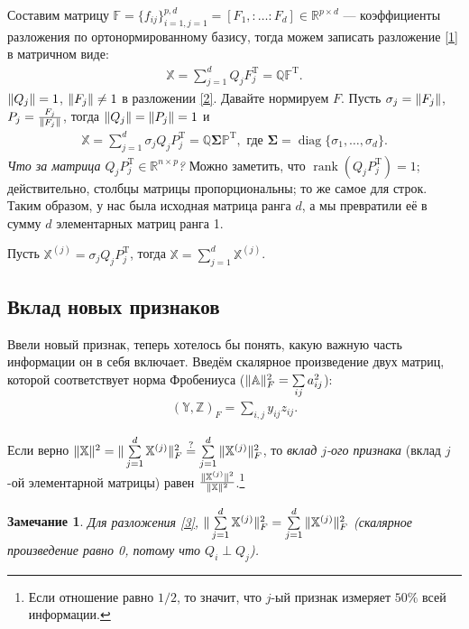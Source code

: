 \documentclass[specialist, 12pt,
subf, %
href, colorlinks=true,
substylefile = spbu.rtx,
]{disser}
\newtheorem{proposition}{Предложение}
\newtheorem{remark}{Замечание}
\DeclareMathOperator{\diag}{diag}
\DeclareMathOperator{\rnk}{rank}
\begin{document}
Составим матрицу $\mathbb{F} = \{f_{ij}\}_{i = 1, j = 1}^{p,d}= [F_1,:\ldots:F_d] \in \mathbb{R}^{p \times d}$ --- коэффициенты разложения по ортонормированному базису, тогда можем записать разложение \eqref{1} в матричном виде:
\begin{gather}\label{2}
\mathbb{X} = \sum\limits_{j = 1}^d Q_j F_j^{\mathrm{T}} = \mathbb{Q}\mathbb{F}^{\mathrm{T}}.
\end{gather}
$\Arrowvert Q_j\Arrowvert = 1$, $\Arrowvert F_j\Arrowvert \neq 1$ в разложении \eqref{2}. Давайте нормируем $F$. Пусть $\sigma_j = \Arrowvert F_j\Arrowvert$, $P_j = \frac{F_j}{\Arrowvert F_j\Arrowvert}$, тогда $\Arrowvert Q_j\Arrowvert = \Arrowvert P_j\Arrowvert = 1$ и
\begin{gather}\label{3}
\mathbb{X} = \sum\limits_{j = 1}^d \sigma_j Q_j P_j^{\mathrm{T}} = \mathbb{Q} \mathbf{\bm\Sigma} \mathbb{P}^{\mathrm{T}}, \text{ где $\mathbf{\bm\Sigma} = \diag\{\sigma_1, \ldots, \sigma_d\}$.}
\end{gather}
\textit{Что за матрица $Q_jP_j^{\mathrm{T}} \in \mathbb{R}^{n \times p}$?} Можно заметить, что $\rnk(Q_jP_j^{\mathrm{T}}) = 1$; действительно, столбцы матрицы пропорциональны; то же самое для строк. Таким образом, у нас была исходная матрица ранга $d$, а мы превратили её в сумму $d$ элементарных матриц ранга 1.


Пусть $\mathbb{X}^{(j)} = \sigma_jQ_jP_j^{\mathrm{T}}$, тогда $\mathbb{X} = \sum\limits_{j = 1}^d \mathbb{X}^{(j)}$.
\subsection{Вклад новых признаков}
Ввели новый признак, теперь хотелось бы понять, какую важную часть информации он в себя включает. Введём скалярное произведение двух матриц, которой соответствует норма Фробениуса ($\Arrowvert \mathbb{A}\Arrowvert^2_F = \sum\limits_{ij}a_{ij}^2$):
\begin{gather*}
(\mathbb{Y}, \mathbb{Z})_F = \sum\limits_{i, j} y_{ij} z_{ij}.
\end{gather*}

Если верно $\Arrowvert\mathbb{X}\Arrowvert^2 = \Arrowvert\sum\limits_{j = 1}^d \mathbb{X}^{(j)}\Arrowvert^2_F \stackrel{?}{=} \sum\limits_{j = 1}^d\Arrowvert\mathbb{X}^{(j)}\Arrowvert^2_F$, то \textit{вклад $j$-ого признака} (вклад $j$-ой элементарной матрицы) равен $\frac{\Arrowvert\mathbb{X}^{(j)}\Arrowvert^2}{\Arrowvert\mathbb{X}\Arrowvert^2}$.\footnote{Если отношение равно $1/2$, то значит, что $j$-ый признак измеряет $50\%$ всей информации.}
\begin{remark}
	Для разложения \eqref{3}, $\Arrowvert\sum\limits_{j = 1}^d \mathbb{X}^{(j)}\Arrowvert^2_F = \sum\limits_{j = 1}^d\Arrowvert\mathbb{X}^{(j)}\Arrowvert^2_F$ (скалярное произведение равно 0, потому что $Q_i \perp Q_j$).
\end{remark}
\end{document}
